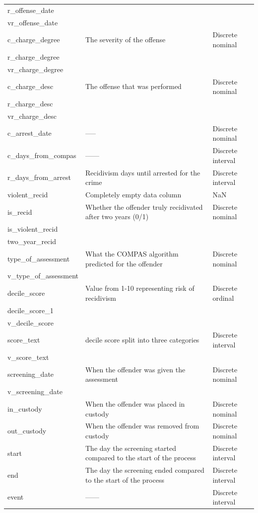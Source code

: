 \documentclass[11pt, fleqn, titlepage]{article}
\begin{document}
\begin{longtable}{l l l}
		r\_offense\_date & & \\
		vr\_offense\_date & & \\ \hdashline
		c\_charge\_degree & The severity of the offense & Discrete nominal \\
		r\_charge\_degree & & \\
		vr\_charge\_degree & & \\ \hdashline
		c\_charge\_desc & The offense that was performed & Discrete nominal \\
		r\_charge\_desc & & \\
		vr\_charge\_desc & & \\ \hdashline
		c\_arrest\_date & ----- & Discrete nominal \\
		c\_days\_from\_compas & ------ & Discrete interval \\
		r\_days\_from\_arrest & Recidivism days until arrested for the crime & Discrete interval \\
		violent\_recid & Completely empty data column & NaN \\ \hdashline
		is\_recid & Whether the offender truly recidivated after two years (0/1) & Discrete nominal \\
		is\_violent\_recid & & \\
		two\_year\_recid & & \\ \hdashline
		type\_of\_assessment & What the COMPAS algorithm predicted for the offender & Discrete nominal \\
		v\_type\_of\_assessment & & \\ \hdashline
		decile\_score & Value from 1-10 representing risk of recidivism & Discrete ordinal \\
		decile\_score\_1 & & \\
		v\_decile\_score & & \\ \hdashline
		score\_text & decile score split into three categories & Discrete interval \\
		v\_score\_text & & \\ \hdashline
		screening\_date & When the offender was given the assessment & Discrete nominal \\
		v\_screening\_date & & \\ \hdashline
		in\_custody & When the offender was placed in custody & Discrete nominal \\
		out\_custody & When the offender was removed from custody & Discrete nominal \\
		start & The day the screening started compared to the start of the process & Discrete interval \\
		end & The day the screening ended compared to the start of the process & Discrete interval \\
		event & ------ & Discrete interval
	\end{longtable}
		
\end{document}
